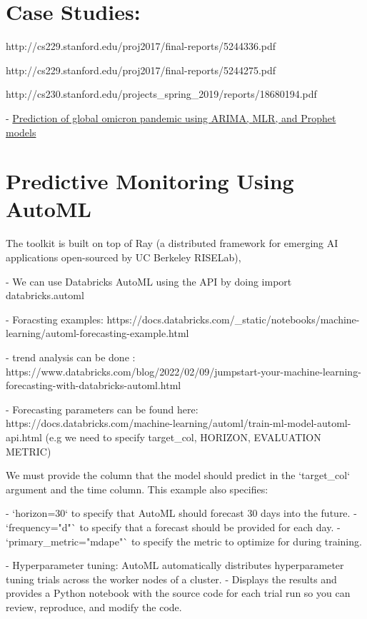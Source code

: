 \documentclass[openany]{book}
\begin{document}
\section{Case Studies: }

http://cs229.stanford.edu/proj2017/final-reports/5244336.pdf 

http://cs229.stanford.edu/proj2017/final-reports/5244275.pdf

http://cs230.stanford.edu/projects_spring_2019/reports/18680194.pdf



- \href{https://www.nature.com/articles/s41598-022-23154-4}{Prediction of global omicron pandemic using ARIMA, MLR, and Prophet models}



\section{Predictive Monitoring Using AutoML}


The toolkit is built on top of Ray (a distributed framework for emerging AI applications open-sourced by UC Berkeley RISELab), 

- We can use Databricks AutoML using the API by doing import databricks.automl

- Foracsting examples: https://docs.databricks.com/_static/notebooks/machine-learning/automl-forecasting-example.html

- trend analysis can be done : https://www.databricks.com/blog/2022/02/09/jumpstart-your-machine-learning-forecasting-with-databricks-automl.html

- Forecasting parameters can be found here: https://docs.databricks.com/machine-learning/automl/train-ml-model-automl-api.html (e.g we need to specify target_col, HORIZON, EVALUATION METRIC)


We must provide the column that the model should predict in the `target_col` argument and the time column.  This example also specifies:

- `horizon=30` to specify that AutoML should forecast 30 days into the future. 
- `frequency="d"` to specify that a forecast should be provided for each day. 
- `primary_metric="mdape"` to specify the metric to optimize for during training.



- Hyperparameter tuning: AutoML automatically distributes hyperparameter tuning trials across the worker nodes of a cluster.
- Displays the results and provides a Python notebook with the source code for each trial run so you can review, reproduce, and modify the code. 
\end{document}
